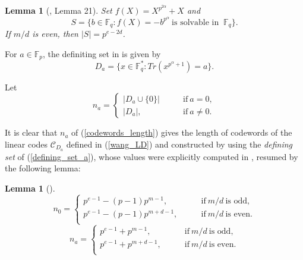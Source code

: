 \documentclass[final,1p,times]{elsarticle}
\newtheorem{sec3_lemma3}[sec3_lemma1x]{Lemma}
\newtheorem{sec3_lemma4}[sec3_lemma1x]{Lemma}
\begin{document}
  \begin{sec3_lemma3}[\cite{Bib7}, Lemma 21]\label{s3_lemma3}
  Set $ f(X)=X^{p^{2\alpha}} +X $ and 
  \begin{equation*}
  S=\lbrace b\in \mathbb{F}_{q}: f(X)=- b^{p^{\alpha}} \ \text{is solvable in }\   \mathbb{F}_{q} \rbrace.
  \end{equation*}
  If $ m/d $ is even, then $ | S |=p^{e-2d} $.
  \end{sec3_lemma3}
  
  For $ a\in \mathbb{F}_{p} $, the definiting set in \cite{Bib7} is given by
  \begin{equation}\label{defining_set_a}
  D_{a}=\biggl\lbrace x\in \mathbb{F}_{q}^{*} : Tr(x^{p^{\alpha}+1}) =a\biggr\rbrace.
  \end{equation}
  
  Let 
  \begin{equation}\label{codewords_length}
  n_{a}=
  \begin{cases}
  | D_{a} \cup \lbrace 0\rbrace | &\qquad\text{if}\ a=0,\\
  | D_{a}|,&\qquad\text{if}\ a\ne 0.
  \end{cases}
  \end{equation}
  
  It is clear that $ n_{a} $ of (\ref{codewords_length}) gives the length of codewords of the linear codes $ \mathcal{C}_{D_{a}} $ defined in (\ref{wang_LD}) and constructed by using the \textit{defining set} of (\ref{defining_set_a}), whose values were explicitly computed in \cite{Bib7}, resumed by the following lemma:
  
  \begin{sec3_lemma4}[\cite{Bib7}]\label{s3_lemma4}
  \begin{equation*}
  n_{0}=
  \begin{cases}
  p^{e-1}-(p-1)p^{m-1},&\qquad\text{if}\ m/d \ \text{is odd},\\
  p^{e-1}-(p-1)p^{m+d-1},&\qquad\text{if}\ m/d \ \text{is even}.\\
  \end{cases}
  \end{equation*}
  \begin{equation*}
    n_{a}=
    \begin{cases}
    p^{e-1}+p^{m-1},&\qquad\text{if}\ m/d \ \text{is odd},\\
    p^{e-1}+p^{m+d-1},&\qquad\text{if}\ m/d \ \text{is even}.\\
    \end{cases}
  \end{equation*}
  \end{sec3_lemma4}
  
\end{document}
